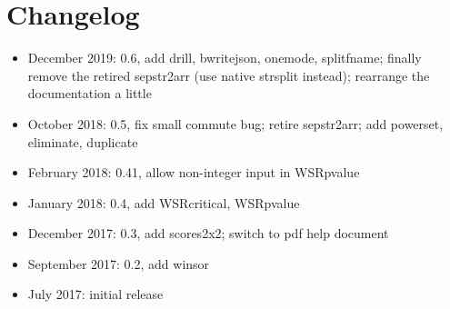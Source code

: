 \documentclass[11pt,english]{article}
\begin{document}
\section{Changelog }
\begin{itemize}
\item December 2019: 0.6, add drill, bwritejson, onemode, splitfname; 
    finally remove the retired sepstr2arr (use native strsplit instead);
    rearrange the documentation a little
\item October 2018: 0.5, fix small commute bug; retire sepstr2arr; add powerset,
  eliminate, duplicate
\item February 2018: 0.41, allow non-integer input in WSRpvalue
\item January 2018: 0.4, add WSRcritical, WSRpvalue
\item December 2017: 0.3, add scores2x2; switch to pdf help document
\item September 2017: 0.2, add winsor 
\item July 2017: initial release
\end{itemize}
\end{document}

